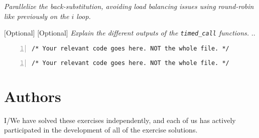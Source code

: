 \documentclass{article}
\begin{document}
\begin{ExerciseList}
\Exercise
{}
\Question \emph{Parallelize the back-substitution, avoiding load
  balancing issues using round-robin like previously on the $i$ loop.}

\Exercise $[$Optional$]$
\Question $[$Optional$]$ \emph{Explain the different outputs of the
  \texttt{timed\_call} functions.}
\Answer .. %

\end{ExerciseList}

\begin{lstlisting}[basicstyle=\small\sffamily,
keywords={break,case,const,continue,default,else,enum,
for,if,return,switch,while,do,long,void,int,float,double,
char,struct,typedef,include,size\_t},
keywordstyle={\color{blue}},
comment={[l]{//}}, morecomment={[s]{/*}{*/}}, commentstyle=\itshape,
columns={[l]flexible}, numbers=left, numberstyle=\tiny,
frameround=fftt, frame=shadowbox, captionpos=b,
caption={Matrix inversion with semaphores.},
label=LST:invmat1]
/* Your relevant code goes here. NOT the whole file. */
\end{lstlisting}

\begin{lstlisting}[basicstyle=\small\sffamily,
keywords={break,case,const,continue,default,else,enum,
for,if,return,switch,while,do,long,void,int,float,double,
char,struct,typedef,include,size\_t},
keywordstyle={\color{blue}},
comment={[l]{//}}, morecomment={[s]{/*}{*/}}, commentstyle=\itshape,
columns={[l]flexible}, numbers=left, numberstyle=\tiny,
frameround=fftt, frame=shadowbox, captionpos=b,
caption={Matrix inversion with barriers.},
label=LST:invmat2]
/* Your relevant code goes here. NOT the whole file. */
\end{lstlisting}


\newpage
\section{Authors}
I/We have solved these exercises independently, and each of us has actively
participated in the development of all of the exercise solutions.
\vspace{1cm}
\end{document}
